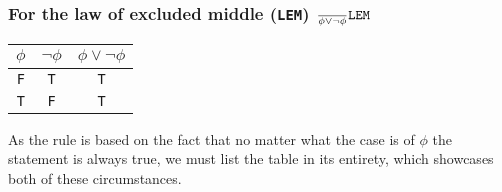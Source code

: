 \documentclass[11pt,a4paper]{article}
\begin{document}
\subsubsection*{For the law of excluded middle ({\tt LEM}) $\frac{}{\phi \lor \neg\phi}\text{\tt LEM}$}
\begin{center}
	\begin{tabular}{c||c||c}
		$\phi$ & $\neg\phi$ & $\phi \lor \neg\phi$ \\ \hline
		{\tt F} & {\tt T} & {\tt T} \\
		{\tt T} & {\tt F} & {\tt T}
	\end{tabular}
\end{center}
As the rule is based on the fact that no matter what the case is of $\phi$ the statement is always true, we must list the table in its entirety, which showcases both of these circumstances.
\end{document}
